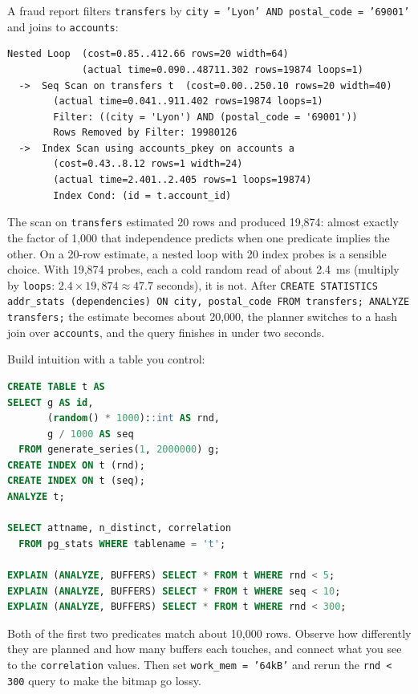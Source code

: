 \begin{example}
\label{ch07:ex-bad-plan}
A fraud report filters \texttt{transfers} by \texttt{city = 'Lyon' AND postal\_code = '69001'} and joins to \texttt{accounts}:
\begin{lstlisting}[language=Plain]
Nested Loop  (cost=0.85..412.66 rows=20 width=64)
             (actual time=0.090..48711.302 rows=19874 loops=1)
  ->  Seq Scan on transfers t  (cost=0.00..250.10 rows=20 width=40)
        (actual time=0.041..911.402 rows=19874 loops=1)
        Filter: ((city = 'Lyon') AND (postal_code = '69001'))
        Rows Removed by Filter: 19980126
  ->  Index Scan using accounts_pkey on accounts a
        (cost=0.43..8.12 rows=1 width=24)
        (actual time=2.401..2.405 rows=1 loops=19874)
        Index Cond: (id = t.account_id)
\end{lstlisting}
The scan on \texttt{transfers} estimated 20 rows and produced 19,874: almost exactly the factor of 1,000 that independence predicts when one predicate implies the other. On a 20-row estimate, a nested loop with 20 index probes is a sensible choice. With 19,874 probes, each a cold random read of about 2.4~ms (multiply by \texttt{loops}: $2.4 \times 19{,}874 \approx 47.7$ seconds), it is not. After \texttt{CREATE STATISTICS addr\_stats (dependencies) ON city, postal\_code FROM transfers; ANALYZE transfers;} the estimate becomes about 20,000, the planner switches to a hash join over \texttt{accounts}, and the query finishes in under two seconds.
\end{example}

\begin{labbox}
Build intuition with a table you control:
\begin{lstlisting}[language=SQL]
CREATE TABLE t AS
SELECT g AS id,
       (random() * 1000)::int AS rnd,
       g / 1000 AS seq
  FROM generate_series(1, 2000000) g;
CREATE INDEX ON t (rnd);
CREATE INDEX ON t (seq);
ANALYZE t;

SELECT attname, n_distinct, correlation
  FROM pg_stats WHERE tablename = 't';

EXPLAIN (ANALYZE, BUFFERS) SELECT * FROM t WHERE rnd < 5;
EXPLAIN (ANALYZE, BUFFERS) SELECT * FROM t WHERE seq < 10;
EXPLAIN (ANALYZE, BUFFERS) SELECT * FROM t WHERE rnd < 300;
\end{lstlisting}
Both of the first two predicates match about 10,000 rows. Observe how differently they are planned and how many buffers each touches, and connect what you see to the \texttt{correlation} values. Then set \texttt{work\_mem = '64kB'} and rerun the \texttt{rnd < 300} query to make the bitmap go lossy.
\end{labbox}

